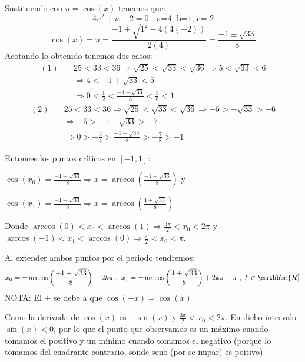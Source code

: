 \documentclass[12pt]{article}
\begin{document}
\begin{enumerate}[\hspace{9px} a)]
        Sustituendo con \(u=\cos(x)\) tenemos que:
        \begin{equation*}
            4u^2+u-2=0 \quad \text{a=4, b=1, c=-2}
        \end{equation*}
        \begin{equation*}
            \cos(x) = u = \frac{-1\pm\sqrt{1^2-4(4(-2))}}{2(4)} = \frac{-1\pm\sqrt{33}}{8}
        \end{equation*}
        Acotando lo obtenido tenemos dos casos:
        \begin{align*}
            (1) \quad &25<33<36 \Longrightarrow \sqrt{25}<\sqrt{33}<\sqrt{36} \Longrightarrow 5<\sqrt{33}<6 \\
            &\Longrightarrow 4<-1+\sqrt{33}<5 \\
            &\Longrightarrow 0<\frac{1}{2}<\frac{-1+\sqrt{33}}{8}<\frac{5}{8}<1
        \end{align*}
        \begin{align*}
            (2) \quad &25<33<36 \Longrightarrow \sqrt{25}<\sqrt{33}<\sqrt{36} \Longrightarrow -5>-\sqrt{33}>-6 \\
            &\Longrightarrow -6>-1-\sqrt{33}>-7 \\
            &\Longrightarrow 0>-\frac{3}{4}>\frac{-1-\sqrt{33}}{8}>-\frac{7}{8}>-1
        \end{align*}

        Entonces los puntos cr\'iticos en \([-1,1]\): \medskip
        
        \(\cos(x_0)=\displaystyle\frac{-1+\sqrt{33}}{8} \Longrightarrow x = \arccos\left(\frac{-1+\sqrt{33}}{8}\right)\) y \medskip
        
        \(\cos(x_1)=\displaystyle\frac{-1-\sqrt{33}}{8} \Longrightarrow x = \arccos\left(\frac{1+\sqrt{33}}{8}\right)\)

        Donde \(\arccos(0)<x_0<\arccos(1) \Longrightarrow \frac{3\pi}{2}<x_0<2\pi\) y \(\arccos(-1)<x_1<\arccos(0) \Longrightarrow \frac{\pi}{2}<x_0<\pi\).

        Al extender ambos puntos por el periodo tendremos:
        \begin{align*}
            x_0 = \pm\arccos\left(\frac{-1+\sqrt{33}}{8}\right)+2k\pi \ , \ x_1 = \pm\arccos\left(\frac{1+\sqrt{33}}{8}\right)+2k\pi+\pi\ , \ k\in\mathbbm{R}
        \end{align*}
        NOTA: El \(\pm\) se debe a que \(\cos(-x)=\cos(x)\)\medskip

        Como la derivada de \(\cos(x)\) es \(-\sin(x)\) y \(\frac{3\pi}{2}<x_0<2\pi\). En dicho intervalo \(\sin(x)<0\), por lo que el punto que observamos es un m\'aximo cuando tomamos el positivo y un m\'inimo cuando tomamos el negativo (porque lo tomamos del cuadrante contrario, sonde seno (por se impar) es poitivo).


\end{enumerate}
\end{document}
